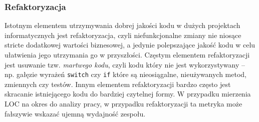 \subsubsection*{Refaktoryzacja}
Istotnym elementem utrzymywania dobrej jakości kodu w dużych projektach informatycznych jest refaktoryzacja, czyli niefunkcjonalne zmiany nie niosące stricte dodatkowej wartości biznesowej,
a jedynie polepszające jakość kodu w celu ułatwienia jego utrzymania go w przyszłości.
Częstym elementem refaktoryzacji jest usuwanie tzw. \textit{martwego kodu}, czyli kodu który nie jest wykorzystywany -- np. gałęzie wyrażeń \texttt{switch} czy \texttt{if} które są nieosiągalne, nieużywanych metod, zmiennych czy testów.
Innym elementem refaktoryzacji bardzo często jest skracanie istniejącego kodu do bardziej czytelnej formy.
W przypadku mierzenia LOC na okres do analizy pracy, w przypadku refaktoryzacji ta metryka może fałszywie wskazać ujemną wydajność zespołu.

